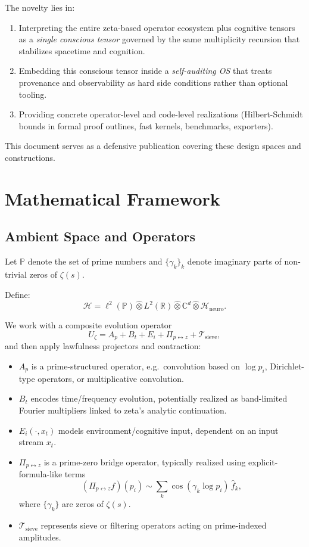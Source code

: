 \documentclass[11pt]{article}
\begin{document}
The novelty lies in:

\begin{enumerate}[leftmargin=*]
  \item Interpreting the entire zeta-based operator ecosystem plus cognitive tensors as a \emph{single conscious tensor} governed by the same multiplicity recursion that stabilizes spacetime and cognition.
  \item Embedding this conscious tensor inside a \emph{self-auditing OS} that treats provenance and observability as hard side conditions rather than optional tooling.
  \item Providing concrete operator-level and code-level realizations (Hilbert-Schmidt bounds in formal proof outlines, fast kernels, benchmarks, exporters).
\end{enumerate}

This document serves as a defensive publication covering these design spaces and constructions.

\section{Mathematical Framework}

\subsection{Ambient Space and Operators}

Let $\mathbb{P}$ denote the set of prime numbers and $\{\gamma_k\}_k$ denote imaginary parts of non-trivial zeros of $\zeta(s)$.

Define:
\[
\mathcal{H}
  = \ell^2(\mathbb{P})
    \widehat{\otimes} L^2(\mathbb{R})
    \widehat{\otimes} \mathbb{C}^d
    \widehat{\otimes} \mathcal{H}_{\text{neuro}}.
\]

We work with a composite evolution operator
\[
U_\zeta = A_p + B_t + E_i + \Pi_{p\leftrightarrow z} + \mathcal{T}_{\text{sieve}},
\]
and then apply lawfulness projectors and contraction:

\begin{itemize}[leftmargin=*]
  \item $A_p$ is a prime-structured operator, e.g.\ convolution based on $\log p_i$, Dirichlet-type operators, or multiplicative convolution.
  \item $B_t$ encodes time/frequency evolution, potentially realized as band-limited Fourier multipliers linked to zeta's analytic continuation.
  \item $E_i(\cdot,x_t)$ models environment/cognitive input, dependent on an input stream $x_t$.
  \item $\Pi_{p\leftrightarrow z}$ is a prime-zero bridge operator, typically realized using explicit-formula-like terms
    \[
      (\Pi_{p\leftrightarrow z} f)(p_i)
        \sim \sum_k \cos(\gamma_k \log p_i)\,\widehat{f}_k,
    \]
    where $\{\gamma_k\}$ are zeros of $\zeta(s)$.
  \item $\mathcal{T}_{\text{sieve}}$ represents sieve or filtering operators acting on prime-indexed amplitudes.
\end{itemize}
\end{document}
